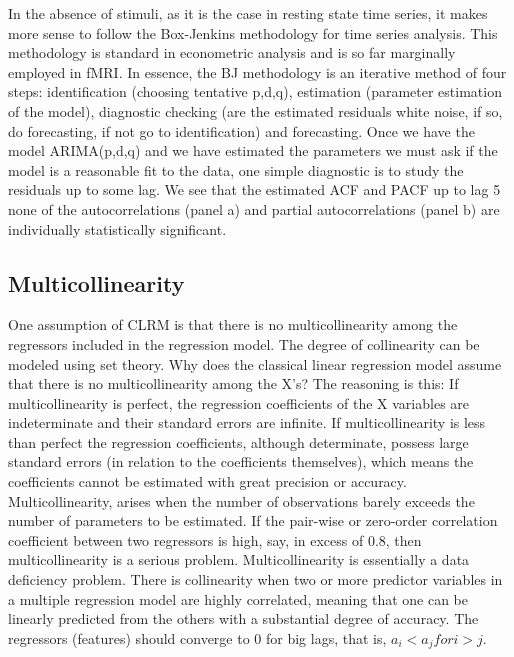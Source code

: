 \documentclass[10pt,letterpaper]{article}
\begin{document}
In the absence of stimuli, as it is the case in resting state time series, it makes more sense to follow the Box-Jenkins methodology for time series analysis. 
This methodology is standard in econometric analysis and is so far marginally employed in fMRI.  
In essence, the BJ methodology is an iterative method of four steps: identification (choosing tentative p,d,q), estimation (parameter estimation of the model), diagnostic checking (are the estimated residuals white noise, if so, do forecasting, if not go to identification) and forecasting. Once we have the model ARIMA(p,d,q) and we have estimated the parameters we must ask if the model is a reasonable fit to the data, one simple diagnostic is to study the residuals up to some lag. We see that the estimated ACF and PACF up to lag 5 none of the autocorrelations (panel a) and partial autocorrelations (panel b) are individually statistically significant.

\subsection{Multicollinearity}
One assumption of CLRM is that there is no multicollinearity among the regressors included in the regression model. The degree of collinearity can be modeled using set theory.
Why does the classical linear regression model assume that there is no multicollinearity among the X’s? The reasoning is this: If multicollinearity is perfect, the regression coefficients of the X variables are indeterminate and their standard errors are infinite. If multicollinearity is less than perfect the regression coefficients, although determinate, possess large standard errors (in relation to the coefficients themselves), which means the coefficients cannot be estimated with great precision or accuracy.
Multicollinearity, arises when the number of observations barely exceeds the number of parameters to be estimated. If the pair-wise or zero-order correlation coefficient between two regressors is high, say, in excess of 0.8, then multicollinearity is a serious problem. 
Multicollinearity is essentially a data deficiency problem. 
There is collinearity when two or more predictor variables in a multiple regression model are highly correlated, meaning that one can be linearly predicted from the others with a substantial degree of accuracy. The regressors (features) should converge to 0 for big lags, that is, $a_{i} < a_{j} for i > j$.
\end{document}
